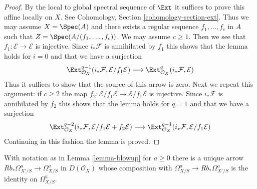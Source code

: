\begin{proof}
By the local to global spectral sequence of $\Ext$ it suffices
to prove this affine locally on $X$. See
Cohomology, Section \ref{cohomology-section-ext}.
Thus we may assume $X = \Spec(A)$
and there exists a regular sequence $f_1, \ldots, f_c$ in $A$
such that $Z = \Spec(A/(f_1, \ldots, f_c))$. We may assume $c \geq 1$.
Then we see that $f_1 : \mathcal{E} \to \mathcal{E}$
is injective. Since $i_*\mathcal{F}$ is annihilated by $f_1$
this shows that the lemma holds for $i = 0$ and that we have
a surjection
$$
\Ext^{q - 1}_{\mathcal{O}_X}(i_*\mathcal{F}, \mathcal{E}/f_1\mathcal{E})
\longrightarrow
\Ext^q_{\mathcal{O}_X}(i_*\mathcal{F}, \mathcal{E})
$$
Thus it suffices to show that the source of this arrow is zero.
Next we repeat this argument: if $c \geq 2$ the map
$f_2 : \mathcal{E}/f_1\mathcal{E} \to \mathcal{E}/f_1\mathcal{E}$
is injective. Since $i_*\mathcal{F}$ is annihilated by $f_2$
this shows that the lemma holds for $q = 1$ and that we have a
surjection
$$
\Ext^{q - 2}_{\mathcal{O}_X}(i_*\mathcal{F},
\mathcal{E}/f_1\mathcal{E} + f_2\mathcal{E})
\longrightarrow
\Ext^{q - 1}_{\mathcal{O}_X}(i_*\mathcal{F}, \mathcal{E}/f_1\mathcal{E})
$$
Continuing in this fashion the lemma is proved.
\end{proof}

\begin{lemma}
\label{lemma-splitting-on-omega-a}
With notation as in Lemma \ref{lemma-blowup} for $a \geq 0$
there is a unique arrow
$Rb_*\Omega^a_{X'/S} \to \Omega^a_{X/S}$ in $D(\mathcal{O}_X)$
whose composition with $\Omega^a_{X/S} \to Rb_*\Omega^a_{X'/S}$
is the identity on $\Omega^a_{X/S}$.
\end{lemma}

